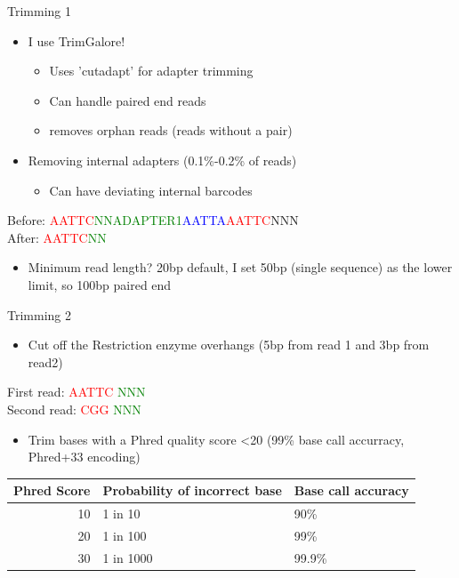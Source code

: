 \documentclass[presentation]{beamer}
\begin{document}
\begin{frame}[label=sec-8]{Trimming 1}
\begin{itemize}
\item I use TrimGalore!
\begin{itemize}
\item Uses 'cutadapt' for adapter trimming
\item Can handle paired end reads
\item removes orphan reads (reads without a pair)
\end{itemize}
\item Removing internal adapters (0.1\%-0.2\% of reads)
\begin{itemize}
\item Can have deviating internal barcodes
\end{itemize}
\end{itemize}
\begin{latex:}
\footnotesize
Before: \textcolor{red}{AATTC}\textcolor{green}{NNADAPTER1}\textcolor{blue}{AATTA}\textcolor{red}{AATTC}NNN\\
After: \hphantom{A}\textcolor{red}{AATTC}\textcolor{green}{NN}
\end{latex:}
\begin{itemize}
\item Minimum read length? 20bp default, I set 50bp (single sequence) as the lower limit, so 100bp paired end
\end{itemize}
\end{frame}
\begin{frame}[label=sec-9]{Trimming 2}
\begin{itemize}
\item Cut off the Restriction enzyme overhangs (5bp from read 1 and 3bp from read2)
\end{itemize}
\begin{latex:}
\footnotesize
First read: \hphantom{A} \textcolor{red}{AATTC} \textcolor{green}{NNN}\\
Second read: \textcolor{red}{CGG} \textcolor{green}{NNN}
\end{latex:}
\begin{itemize}
\item Trim bases with a Phred quality score <20 (99\% base call accurracy, Phred+33 encoding)
\end{itemize}
\begin{center}
\begin{tabular}{rll}
Phred Score & Probability of incorrect base & Base call accuracy\\
\hline
10 & 1 in 10 & 90\%\\
20 & 1 in 100 & 99\%\\
30 & 1 in 1000 & 99.9\%\\
\end{tabular}
\end{center}
\end{frame}
\end{document}
